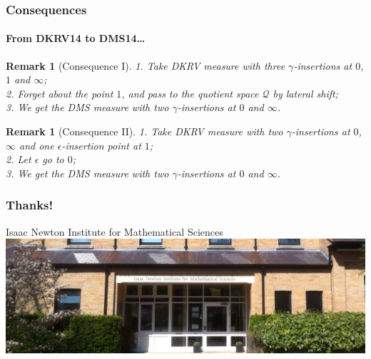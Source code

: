 \documentclass[aspectratio=169]{beamer}
\newtheorem{remark}[theorem]{Remark}
\begin{document}
\begin{frame}
\frametitle{Consequences}
\framesubtitle{From DKRV14 to DMS14\dots}
\begin{remark}[Consequence I]
1. Take DKRV measure with three $\gamma$-insertions at $0$, $1$ and $\infty$;\\
2. Forget about the point $1$, and pass to the quotient space $\mathcal{Q}$ by lateral shift;\\
3. We get the DMS measure with two $\gamma$-insertions at $0$ and $\infty$.
\end{remark}
\begin{remark}[Consequence II]
1. Take DKRV measure with two $\gamma$-insertions at $0$, $\infty$ and one $\epsilon$-insertion point at $1$;\\
2. Let $\epsilon$ go to $0$;\\
3. We get the DMS measure with two $\gamma$-insertions at $0$ and $\infty$.
\end{remark}
\end{frame}

\begin{frame}
\frametitle{Thanks!}
\begin{block}{Isaac Newton Institute for Mathematical Sciences}
\includegraphics[width=\textwidth]{INI.png}
\end{block}
\end{frame}
\end{document}

